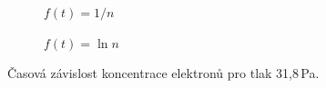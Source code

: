 \documentclass[a4paper,12pt]{article}
\begin{document}
\begin{figure}[h]
	\centering
	\begin{subfigure}[b]{.49\linewidth}
		\centering
		\caption{$f(t) = 1/n$}
	\end{subfigure}
	\begin{subfigure}[b]{.49\linewidth}
		\centering
		\caption{$f(t) = \ln n$}
	\end{subfigure}
	\caption{Časová závislost koncentrace elektronů pro tlak 31,8\,Pa.}
	\label{g:20Pa}
\end{figure}
\end{document}
